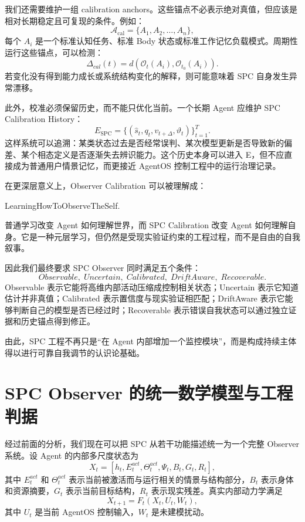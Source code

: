 我们还需要维护一组 calibration anchors。这些锚点不必表示绝对真值，但应该是相对长期稳定且可复现的条件。例如：
\begin{equation}
\mathcal A_{\mathrm{cal}}
=
\{
A_1,A_2,\ldots,A_n
\},
\end{equation}
每个 $A_i$ 是一个标准认知任务、标准 Body 状态或标准工作记忆负载模式。周期性运行这些锚点，可以检测：
\begin{equation}
\Delta_{cal}(t)
=
d
\left(
\mathcal O_t(A_i),
\mathcal O_{t_0}(A_i)
\right).
\end{equation}
若变化没有得到能力成长或系统结构变化的解释，则可能意味着 SPC 自身发生异常漂移。

此外，校准必须保留历史，而不能只优化当前。一个长期 Agent 应维护 SPC Calibration History：
\begin{equation}
E_{\mathrm{SPC}}
=
\{
(\hat s_t,q_t,v_{t+\Delta},\vartheta_t)
\}_{t=1}^{T}.
\end{equation}
这样系统可以追溯：某类状态过去是否经常误判、某次模型更新是否导致新的偏差、某个相态定义是否逐渐失去辨识能力。这个历史本身可以进入 E，但不应直接成为普通用户情景记忆，而更接近 AgentOS 控制工程中的运行治理记录。

在更深层意义上，Observer Calibration 可以被理解成：
\begin{statementbox}
LearningHowToObserveTheSelf.
\end{statementbox}
普通学习改变 Agent 如何理解世界，而 SPC Calibration 改变 Agent 如何理解自身。它是一种元层学习，但仍然是受现实验证约束的工程过程，而不是自由的自我叙事。

因此我们最终要求 SPC Observer 同时满足五个条件：
\begin{equation}
\boxed{
Observable,\;
Uncertain,\;
Calibrated,\;
DriftAware,\;
Recoverable.
}
\end{equation}
Observable 表示它能将高维内部活动压缩成控制相关状态；Uncertain 表示它知道估计并非真值；Calibrated 表示置信度与现实验证相匹配；DriftAware 表示它能够判断自己的模型是否已经过时；Recoverable 表示错误自我状态可以通过独立证据和历史锚点得到修正。

由此，SPC 工程不再只是“在 Agent 内部增加一个监控模块”，而是构成持续主体得以进行可靠自我调节的认识论基础。

\section{SPC Observer 的统一数学模型与工程判据}
\label{sec:spc-unified-model}

经过前面的分析，我们现在可以把 SPC 从若干功能描述统一为一个完整 Observer 系统。设 Agent 的内部多尺度状态为
\begin{equation}
X_t
=
\left[
h_t,
E_t^{act},
\Theta_t^{act},
\Psi_t,
B_t,
G_t,
R_t
\right],
\end{equation}
其中 $E_t^{act}$ 和 $\Theta_t^{act}$ 表示当前被激活而与运行相关的情景与结构部分，$B_t$ 表示身体和资源摘要，$G_t$ 表示当前目标结构，$R_t$ 表示现实残差。真实内部动力学满足
\begin{equation}
X_{t+1}
=
F_t(X_t,U_t,W_t),
\end{equation}
其中 $U_t$ 是当前 AgentOS 控制输入，$W_t$ 是未建模扰动。

